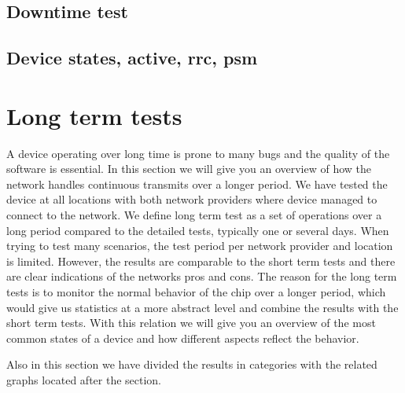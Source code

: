 \documentclass[USenglish]{ifimaster}  %
\begin{document}
\subsection{Downtime test} \label{ssection:downtimetest}

\subsection{Device states, active, rrc, psm}


\section{Long term tests} \label{section:longtermtest}
A device operating over long time is prone to many bugs and the quality of the software is essential. In this section we will give you an overview of how the network handles continuous transmits over a longer period. We have tested the device at all locations with both network providers where device managed to connect to the network. We define long term test as a set of operations over a long period compared to the detailed tests, typically one or several days. When trying to test many scenarios, the test period per network provider and location is limited. However, the results are comparable to the short term tests and there are clear indications of the networks pros and cons. The reason for the long term tests is to monitor the normal behavior of the chip over a longer period, which would give us statistics at a more abstract level and combine the results with the short term tests. With this relation we will give you an overview of the most common states of a device and how different aspects reflect the behavior.

Also in this section we have divided the results in categories with the related graphs located after the section.
\end{document}
